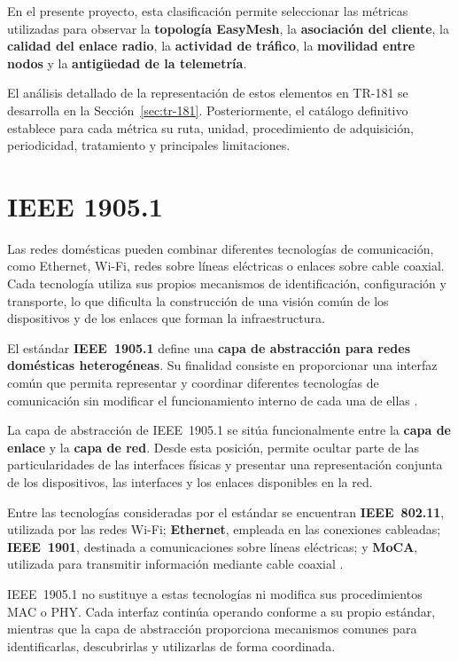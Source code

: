 En el presente proyecto, esta clasificación permite seleccionar las
métricas utilizadas para observar la
\textbf{topología EasyMesh}, la
\textbf{asociación del cliente}, la
\textbf{calidad del enlace radio}, la
\textbf{actividad de tráfico}, la
\textbf{movilidad entre nodos} y la
\textbf{antigüedad de la telemetría}.

El análisis detallado de la representación de estos elementos en
TR-181 se desarrolla en la Sección~\ref{sec:tr-181}. Posteriormente, el
catálogo definitivo establece para cada métrica su ruta, unidad,
procedimiento de adquisición, periodicidad, tratamiento y principales
limitaciones.

\section{IEEE 1905.1}
\label{sec:ieee-1905-1}

Las redes domésticas pueden combinar diferentes tecnologías de
comunicación, como Ethernet, Wi-Fi, redes sobre líneas eléctricas o
enlaces sobre cable coaxial. Cada tecnología utiliza sus propios
mecanismos de identificación, configuración y transporte, lo que
dificulta la construcción de una visión común de los dispositivos y de
los enlaces que forman la infraestructura.

El estándar \textbf{IEEE~1905.1} define una
\textbf{capa de abstracción para redes domésticas heterogéneas}. Su
finalidad consiste en proporcionar una interfaz común que permita
representar y coordinar diferentes tecnologías de comunicación sin
modificar el funcionamiento interno de cada una de ellas
\cite{ieee_1905_1}.

La capa de abstracción de IEEE~1905.1 se sitúa funcionalmente entre la
\textbf{capa de enlace} y la \textbf{capa de red}. Desde esta posición,
permite ocultar parte de las particularidades de las interfaces físicas y
presentar una representación conjunta de los dispositivos, las
interfaces y los enlaces disponibles en la red.

Entre las tecnologías consideradas por el estándar se encuentran
\textbf{IEEE~802.11}, utilizada por las redes Wi-Fi;
\textbf{Ethernet}, empleada en las conexiones cableadas;
\textbf{IEEE~1901}, destinada a comunicaciones sobre líneas eléctricas;
y \textbf{MoCA}, utilizada para transmitir información mediante cable
coaxial \cite{ieee_1905_1}.

IEEE~1905.1 no sustituye a estas tecnologías ni modifica sus
procedimientos MAC o PHY. Cada interfaz continúa operando conforme a su
propio estándar, mientras que la capa de abstracción proporciona
mecanismos comunes para identificarlas, descubrirlas y utilizarlas de
forma coordinada.

